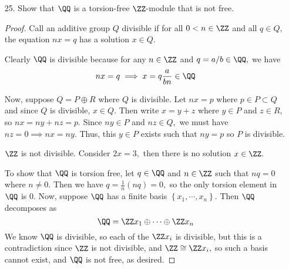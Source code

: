 \documentclass{article}
\begin{document}
\begin{itemize}
	\item[25.] Show that $\QQ$ is a torsion-free $\ZZ$-module that is not free. 
		\begin{proof}
			Call an additive group $Q$ divisible if for all $0<n\in\ZZ$ and all $q\in Q,$ the equation $nx=q$ has a solution $x\in Q.$ 

			Clearly $\QQ$ is divisible because for any $n\in\ZZ$ and $q=a/b\in\QQ,$ we have
			\[nx=q\implies x=q\frac{a}{bn}\in\QQ\]

			Now, suppose $Q=P\oplus R$ where $Q$ is divisible. Let $nx=p$ where $p\in P\subset Q$ and since $Q$ is divisible, $x\in Q.$ Then write $x=y+z$ where $y\in P$ and $z\in R,$ so $nx=ny+nz=p.$ Since $ny\in P$ and $nz\in Q,$ we must have $nz=0\implies nx=ny.$ Thus, this $y\in P$ exists such that $ny=p$ so $P$ is divisible. 

			$\ZZ$ is not divisible. Consider $2x=3,$ then there is no solution $x\in\ZZ.$ 

			To show that $\QQ$ is torsion free, let $q\in \QQ$ and $n\in\ZZ$ such that $nq=0$ where $n\neq 0.$ Then we have $q=\frac{1}{n}(nq)=0,$ so the only torsion element in $\QQ$ is 0. Now, suppose $\QQ$ has a finite basis $\left\{ x_1, \cdots, x_n \right\}.$ Then $\QQ$ decomposes as
			\[\QQ=\ZZ x_1 \oplus \cdots \oplus \ZZ x_n\]
			We know $\QQ$ is divisible, so each of the $\ZZ x_i$ is divisible, but this is a contradiction since $\ZZ$ is not divisible, and $\ZZ\cong \ZZ x_i,$ so such a basis cannot exist, and $\QQ$ is not free, as desired.
		\end{proof}

\end{itemize}
\end{document}
